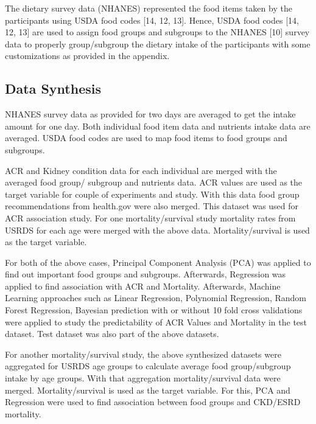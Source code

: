 \noindent The dietary survey data (NHANES) represented the food items taken by the participants using USDA food codes [14, 12, 13]. Hence, USDA food codes [14, 12, 13] are used to assign food groups and subgroups to the NHANES [10] survey data to properly group/subgroup the dietary intake of the participants with some customizations as provided in the appendix.

\subsection{Data Synthesis}

\noindent NHANES survey data as provided for two days are averaged to get the intake amount for one day. Both individual food item data and nutrients intake data are averaged. USDA food codes are used to map food items to food groups and subgroups.

\noindent ACR and Kidney condition data for each individual are merged with the averaged food group/ subgroup and nutrients data. ACR values are used as the target variable for couple of experiments and study. With this data food group recommendations from health.gov were also merged. This dataset was used for ACR association study. For one mortality/survival study mortality rates from USRDS for each age were merged with the above data. Mortality/survival is used as the target variable.

\noindent For both of the above cases, Principal Component Analysis (PCA) was applied to find out important food groups and subgroups. Afterwards, Regression was applied to find association with ACR and Mortality. Afterwards, Machine Learning approaches such as Linear Regression, Polynomial Regression, Random Forest Regression, Bayesian prediction with or without 10 fold cross validations were applied to study the predictability of ACR Values and Mortality in the test dataset. Test dataset was also part of the above datasets.

\noindent For another mortality/survival study, the above synthesized datasets were aggregated for USRDS age groups to calculate average food group/subgroup intake by age groups. With that aggregation mortality/survival data were merged. Mortality/survival is used as the target variable. For this, PCA and Regression were used to find association between food groups and CKD/ESRD mortality.